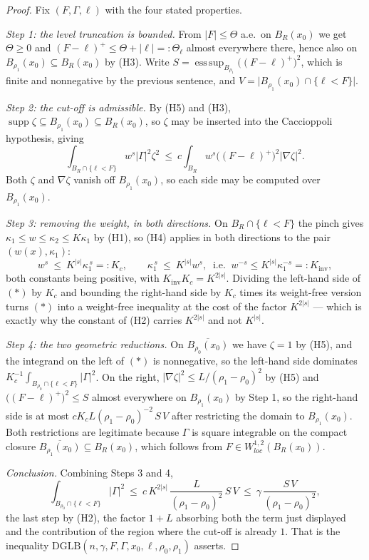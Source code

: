 \begin{proof}
Fix $(F,\Gamma,\ell)$ with the four stated properties.

\emph{Step 1: the level truncation is bounded.}  From $|F|\le\Theta$ a.e.\ on
$B_R(x_0)$ we get $\Theta\ge0$ and
$(F-\ell)^+\le\Theta+|\ell|=:\Theta_\ell$ almost everywhere there, hence also on
$B_{\rho_1}(x_0)\subseteq B_R(x_0)$ by (H3).  Write
$S=\operatorname*{ess\,sup}_{B_{\rho_1}}\bigl((F-\ell)^+\bigr)^2$, which is
finite and nonnegative by the previous sentence, and
$V=\bigl|B_{\rho_1}(x_0)\cap\{\ell<F\}\bigr|$.

\emph{Step 2: the cut-off is admissible.}  By (H5) and (H3),
$\operatorname{supp}\zeta\subseteq B_{\rho_1}(x_0)\subseteq B_R(x_0)$, so
$\zeta$ may be inserted into the Caccioppoli hypothesis, giving
\[
\int_{B_R\cap\{\ell<F\}}w^s|\Gamma|^2\zeta^2
\ \le\ c\int_{B_R}w^s\bigl((F-\ell)^+\bigr)^2|\nabla\zeta|^2 .
\tag{$*$}
\]
Both $\zeta$ and $\nabla\zeta$ vanish off $B_{\rho_1}(x_0)$, so each side may be
computed over $B_{\rho_1}(x_0)$.

\emph{Step 3: removing the weight, in both directions.}  On
$B_R\cap\{\ell<F\}$ the pinch gives $\kappa_1\le w\le\kappa_2\le K\kappa_1$ by
(H1), so (H4) applies in both directions to the pair $(w(x),\kappa_1)$:
\[
w^s\ \le\ K^{|s|}\kappa_1^{\,s}=:K_c,
\qquad
\kappa_1^{\,s}\ \le\ K^{|s|}w^s,\ \text{ i.e. }\ w^{-s}\le K^{|s|}\kappa_1^{-s}=:K_{\mathrm{inv}} ,
\]
both constants being positive, with $K_{\mathrm{inv}}K_c=K^{2|s|}$.  Dividing
the left-hand side of $(*)$ by $K_c$ and bounding the right-hand side by
$K_c$ times its weight-free version turns $(*)$ into a weight-free inequality at
the cost of the factor $K^{2|s|}$ --- which is exactly why the constant of (H2)
carries $K^{2|s|}$ and not $K^{|s|}$.

\emph{Step 4: the two geometric reductions.}  On
$\overline{B_{\rho_0}(x_0)}$ we have $\zeta=1$ by (H5), and the integrand on the
left of $(*)$ is nonnegative, so the left-hand side dominates
$K_c^{-1}\int_{B_{\rho_0}\cap\{\ell<F\}}|\Gamma|^2$.  On the right,
$|\nabla\zeta|^2\le L/(\rho_1-\rho_0)^2$ by (H5) and
$\bigl((F-\ell)^+\bigr)^2\le S$ almost everywhere on $B_{\rho_1}(x_0)$ by
Step 1, so the right-hand side is at most
$cK_cL(\rho_1-\rho_0)^{-2}\,S\,V$ after restricting the domain to
$B_{\rho_1}(x_0)$.  Both restrictions are legitimate because $\Gamma$ is square
integrable on the compact closure $\overline{B_{\rho_1}(x_0)}\subseteq B_R(x_0)$,
which follows from $F\in W^{1,2}_{loc}(B_R(x_0))$.

\emph{Conclusion.}  Combining Steps 3 and 4,
\[
\int_{B_{\rho_0}\cap\{\ell<F\}}|\Gamma|^2
\ \le\ c\,K^{2|s|}\,\frac{L}{(\rho_1-\rho_0)^2}\,S\,V
\ \le\ \gamma\,\frac{S\,V}{(\rho_1-\rho_0)^2},
\]
the last step by (H2), the factor $1+L$ absorbing both the term just displayed
and the contribution of the region where the cut-off is already $1$.  That is
the inequality $\mathrm{DGLB}(n,\gamma,F,\Gamma,x_0,\ell,\rho_0,\rho_1)$
asserts.
\end{proof}
